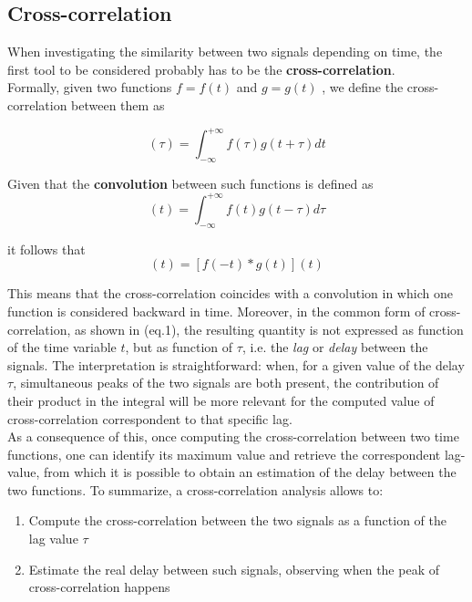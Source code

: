 \documentclass[a4paper]{article}
\begin{document}
\subsection{Cross-correlation}

When investigating the similarity between two signals depending on time, the first tool to be considered probably has to be the \textbf{cross-correlation}.\\
Formally, given two functions $ f = f(t)$ and $ g = g(t)$ , we define the cross-correlation between them as

\begin{equation}
[f(t) \star g(t)] (\tau) = \int_{-\infty}^{+\infty} f(\tau)g(t+\tau) dt 
\end{equation}


Given that the \textbf{convolution} between such functions is defined as 
\begin{equation}
[f(t) * g (t)](t) = \int_{-\infty}^{+\infty} f(t) g (t-\tau) d\tau
\end{equation}

it follows that
\begin{equation}
[f(t) \star g(t)](t) = [f(-t) * g (t)](t) 
\end{equation}

This means that the cross-correlation coincides with a convolution in which one function is considered backward in time. Moreover, in the common form of cross-correlation, as shown in (eq.1), the resulting quantity is not expressed as function of the time variable $t$, but as function of $\tau$, i.e. the \textit{lag} or \textit{delay} between the signals. The interpretation is straightforward: when, for a given value of the delay $\tau$, simultaneous peaks of the two signals are both present, the contribution of their product in the integral will be more relevant for the computed value of cross-correlation correspondent to  that specific lag.\\
As a consequence of this, once computing the cross-correlation between two time functions, one can identify its maximum value and retrieve the correspondent lag-value, from which it is possible to obtain an estimation of the delay between the two functions. To summarize, a cross-correlation analysis allows to:
\begin{enumerate}
	\item Compute the cross-correlation between the two signals as a function of the lag value  $\tau$
	
	\item Estimate the real delay between such signals, observing when the peak of cross-correlation happens
\end{enumerate}
\end{document}
